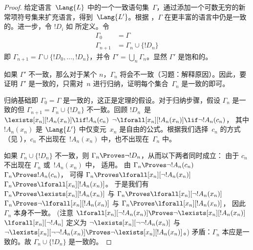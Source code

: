 \documentclass[../../../include/open-logic-section]{subfiles}
\begin{document}
\begin{proof}
给定语言~$\Lang{L}$ 中的一个一致语句集~$\Gamma$，通过添加一个可数无穷的新常项符号集来扩充语言，得到~$\Lang{L'}$。根据 ，$\Gamma$ 在更丰富的语言中仍是一致的。进一步，令 $!D_i$ 如  所定义。令
\begin{align*}
\Gamma_0 & = \Gamma \\
\Gamma_{n+1} & = \Gamma_n \cup \{!D_n \}
\end{align*}
即 $\Gamma_{n+1} = \Gamma \cup \{ !D_0, \dots, !D_n \}$，并令
$\Gamma' = \bigcup_{n} \Gamma_n$。显然 $\Gamma'$ 是饱和的。

如果 $\Gamma'$ 不一致，那么对于某个 $n$，$\Gamma_n$ 将会不一致（习题：解释原因）。因此，要证明 $\Gamma'$ 是一致的，只需对~$n$ 进行归纳，证明每个集合~$\Gamma_n$ 是一致的即可。

归纳基础即 $\Gamma_0 = \Gamma$ 是一致的，这正是定理的假设。对于归纳步骤，假设 $\Gamma_{n}$ 是一致的但 $\Gamma_{n+1} =
\Gamma_n \cup \{!D_n\}$ 不一致。回顾 $!D_n$~是
{$\lexists[x_{n}][!A_{n}(x_n)] \lif !A_{n}(c_{n})$}
{$\lnot\lforall[x_{n}][!A_{n}(x_n)] \lif \lnot !A_{n}(c_{n})$}，
其中 $!A_n(x_n)$ 是 $\Lang{L'}$ 中仅变元~$x_n$ 是自由的公式。根据我们选择~$c_n$ 的方式（见 ），$c_n$ 不出现在~$!A_n(x_n)$ 中，也不出现在~$\Gamma_n$ 中。

如果 $\Gamma_n \cup \{!D_n\}$ 不一致，则 $\Gamma_n
\Proves \lnot !D_n$，从而以下两者同时成立：
由于 $c_n$ 不出现在
$\Gamma_n$ 或~$!A_n(x_n)$ 中，
 适用。
由 
{$\Gamma_n \Proves \lnot !A_n(c_n)$}
{$\Gamma_n \Proves !A_n(c_n)$}，
可得
{$\Gamma_n \Proves \lforall[x_n][\lnot !A_n(x_n)]$}
{$\Gamma_n \Proves \lforall[x_n][!A_n(x_n)]$}。
于是我们有
{$\Gamma_n \Proves \lexists[x_n][!A_n(x_n)]$ 与
$\Gamma_n \Proves \lforall[x_n][\lnot !A_n(x_n)]$}
{$\Gamma_n \Proves \lnot\lforall[x_n][!A_n(x_n)]$ 与
$\Gamma_n \Proves \lforall[x_n][!A_n(x_n)]$}，
因此 $\Gamma_n$ 本身不一致。
{(注意
{$\lforall[x_n][\lnot !A_n(x_n)] \Proves
  \lnot\lexists[x_n][!A_n(x_n)]$}
{$\lforall[x_n][\lnot !A_n]$ 定义为
  $\lnot\lexists[x_n][\lnot\lnot !A_n(x_n)]$ 与
  $\lnot\lexists[x_n][\lnot\lnot !A_n(x_n)] \Proves
  \lnot\lexists[x_n][!A_n(x_n)]$}。)}{}
矛盾：$\Gamma_n$ 本应是一致的。故
$\Gamma_n \cup \{ !D_n\}$ 是一致的。
\end{proof}
\end{document}
